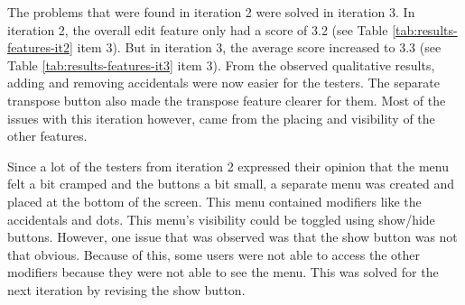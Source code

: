 				The problems that were found in iteration 2 were solved in iteration 3. In iteration 2, the overall edit feature only had a score of 3.2 (see Table \ref{tab:results-features-it2} item 3). But in iteration 3, the average score increased to 3.3 (see Table \ref{tab:results-features-it3} item 3). From the observed qualitative results, adding and removing accidentals were now easier for the testers. The separate transpose button also made the transpose feature clearer for them. Most of the issues with this iteration however, came from the placing and visibility of the other features. 


				Since a lot of the testers from iteration 2 expressed their opinion that the menu felt a bit cramped and the buttons a bit small, a separate menu was created and placed at the bottom of the screen. This menu contained modifiers like the accidentals and dots. This menu's visibility could be toggled using show/hide buttons. However, one issue that was observed was that the show button was not that obvious. Because of this, some users were not able to access the other modifiers because they were not able to see the menu. This was solved for the next iteration by revising the show button. 

